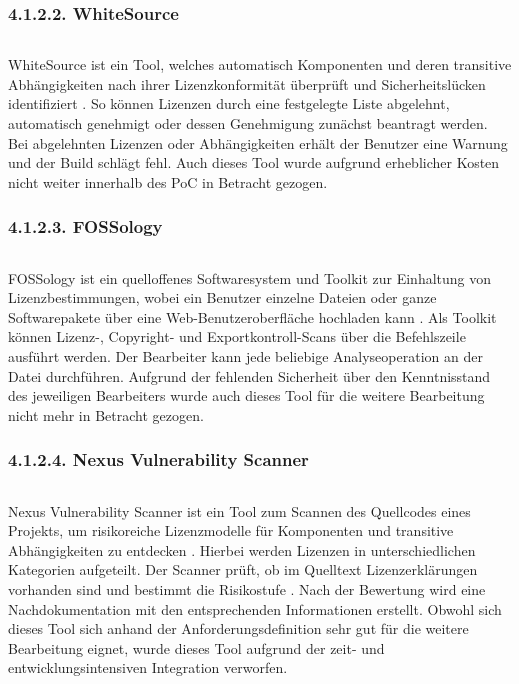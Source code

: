 \subsubsection{4.1.2.2. WhiteSource} $~$

WhiteSource ist ein Tool, welches automatisch Komponenten und deren transitive Abhängigkeiten nach ihrer Lizenzkonformität überprüft und Sicherheitslücken identifiziert \cite{whitesource_software_whitesource_2021}. So können Lizenzen durch eine festgelegte Liste abgelehnt, automatisch genehmigt oder dessen Genehmigung zunächst beantragt werden. Bei abgelehnten Lizenzen oder Abhängigkeiten erhält der Benutzer eine Warnung und der Build schlägt fehl. Auch dieses Tool wurde aufgrund erheblicher Kosten nicht weiter innerhalb des PoC in Betracht gezogen. 

\subsubsection{4.1.2.3. FOSSology} $~$

FOSSology ist ein quelloffenes Softwaresystem und Toolkit zur Einhaltung von Lizenzbestimmungen, wobei ein Benutzer einzelne Dateien oder ganze Softwarepakete über eine Web-Benutzeroberfläche hochladen kann \cite{fossology_workgroup_fossology_2017}. Als Toolkit können Lizenz-, Copyright- und Exportkontroll-Scans über die Befehlszeile ausführt werden. Der Bearbeiter kann jede beliebige Analyseoperation an der Datei durchführen. Aufgrund der fehlenden Sicherheit über den Kenntnisstand des jeweiligen Bearbeiters wurde auch dieses Tool für die weitere Bearbeitung nicht mehr in Betracht gezogen. 

\subsubsection{4.1.2.4. Nexus Vulnerability Scanner} $~$

Nexus Vulnerability Scanner ist ein Tool zum Scannen des Quellcodes eines Projekts, um risikoreiche Lizenzmodelle für Komponenten und transitive Abhängigkeiten zu entdecken \cite{sonatype_nexus_2008}. Hierbei werden Lizenzen in unterschiedlichen Kategorien aufgeteilt. Der Scanner prüft, ob im Quelltext Lizenzerklärungen vorhanden sind und bestimmt die Risikostufe \cite{sonatype_guide_nodate}. Nach der Bewertung wird eine Nachdokumentation mit den entsprechenden Informationen erstellt. Obwohl sich dieses Tool sich anhand der Anforderungsdefinition sehr gut für die weitere Bearbeitung eignet, wurde dieses Tool aufgrund der zeit- und entwicklungsintensiven Integration verworfen.

